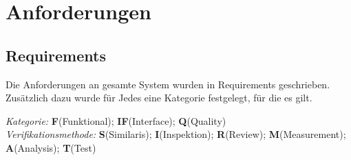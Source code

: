 \chapter{Anforderungen}
\label{cha:Anforderungen}


\section{Requirements}
Die Anforderungen an gesamte System wurden in Requirements geschrieben. Zusätzlich dazu wurde für Jedes eine Kategorie festgelegt, für die es gilt.

\textit{Kategorie:} \textbf{F}(Funktional); \textbf{IF}(Interface);
 \textbf{Q}(Quality)\\
\textit{Verifikationsmethode:} \textbf{S}(Similaris); \textbf{I}(Inspektion); 
\textbf{R}(Review); \textbf{M}(Measurement);
\textbf{A}(Analysis); \textbf{T}(Test)


